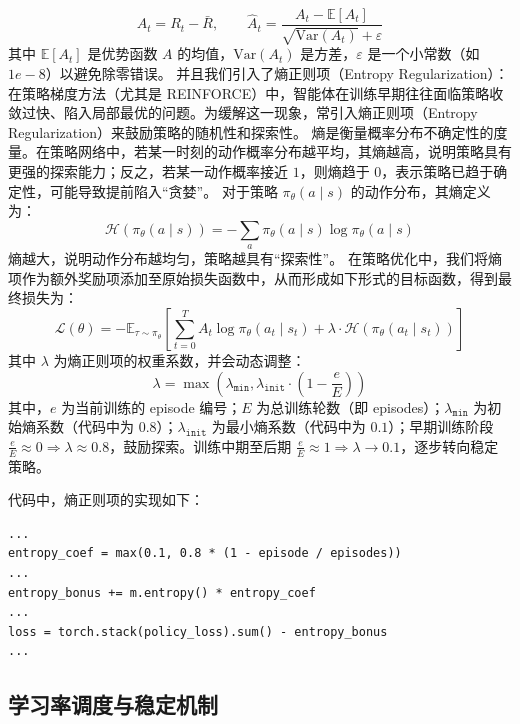 \[
    A_t = R_t - \bar{R}, \qquad \hat{A}_t = \frac{A_t - \mathbb{E}[A_t]}{\sqrt{\text{Var}(A_t)} + \varepsilon}
\]
其中 \(\mathbb{E}[A_t]\) 是优势函数 \(A\) 的均值，\(\text{Var}(A_t)\) 是方差，\(\varepsilon\) 是一个小常数（如 \(1e-8\)）以避免除零错误。
并且我们引入了熵正则项（Entropy Regularization）：在策略梯度方法（尤其是 REINFORCE）中，智能体在训练早期往往面临策略收敛过快、陷入局部最优的问题。为缓解这一现象，常引入熵正则项（Entropy Regularization）来鼓励策略的随机性和探索性。
熵是衡量概率分布不确定性的度量。在策略网络中，若某一时刻的动作概率分布越平均，其熵越高，说明策略具有更强的探索能力；反之，若某一动作概率接近 \(1\)，则熵趋于 \(0\)，表示策略已趋于确定性，可能导致提前陷入“贪婪”。
对于策略 \( \pi_{\theta} \left( a \mid s \right) \) 的动作分布，其熵定义为：
\begin{equation}
    \mathcal{H} \left( \pi_{\theta} \left( a \mid s \right) \right) = - \sum_a \pi_{\theta} \left( a \mid s \right) \log \pi_{\theta} \left( a \mid s \right)
\end{equation}
熵越大，说明动作分布越均匀，策略越具有“探索性”。
在策略优化中，我们将熵项作为额外奖励项添加至原始损失函数中，从而形成如下形式的目标函数，得到最终损失为：
\begin{equation}
    \mathcal{L} \left( \theta \right) = - \mathbb{E}_{\tau \sim \pi_{\theta}} \left[ \sum_{t=0}^{T} A_t \log \pi_{\theta} \left( a_t \mid s_t \right) + \lambda \cdot \mathcal{H} \left( \pi_{\theta} \left( a_t \mid s_t \right) \right) \right]
\end{equation}
其中 \(\lambda\) 为熵正则项的权重系数，并会动态调整：
\[
    \lambda = \max \left( \lambda_{\texttt{min}}, \lambda_{\texttt{init}} \cdot \left( 1 - \frac{e}{E} \right) \right)
\]
其中，\(e\) 为当前训练的 episode 编号；\(E\) 为总训练轮数（即 episodes）；\(\lambda_{\texttt{min}}\) 为初始熵系数（代码中为 \(0.8\)）；\(\lambda_{\texttt{init}}\) 为最小熵系数（代码中为 \(0.1\)）；早期训练阶段 \(\frac{e}{E} \approx 0 \Rightarrow \lambda \approx 0.8\)，鼓励探索。训练中期至后期 \(\frac{e}{E} \approx 1 \Rightarrow \lambda \to 0.1\)，逐步转向稳定策略。

代码中，熵正则项的实现如下：
\begin{verbatim}
...
entropy_coef = max(0.1, 0.8 * (1 - episode / episodes))
...
entropy_bonus += m.entropy() * entropy_coef
...
loss = torch.stack(policy_loss).sum() - entropy_bonus
...
\end{verbatim}

\subsection{学习率调度与稳定机制}

